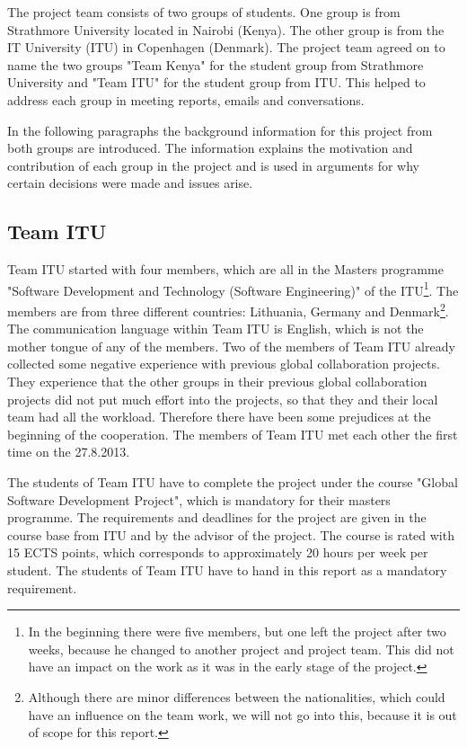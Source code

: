 The project team consists of two groups of students. One group is from Strathmore University located in Nairobi (Kenya). The other group is from the IT University (ITU) in Copenhagen (Denmark). The project team agreed on to name the two groups "Team Kenya" for the student group from Strathmore University and "Team ITU" for the student group from ITU. This helped to address each group in meeting reports, emails and conversations.

In the following paragraphs the background information for this project from both groups are introduced. The information explains the motivation and contribution of each group in the project and is used in arguments for why certain decisions were made and issues arise.


\subsection{Team ITU}
\label{sec:team_ITU}

Team ITU started with four members, which are all in the Masters programme "Software Development and Technology (Software Engineering)" of the ITU\footnote{In the beginning there were five members, but one left the project after two weeks, because he changed to another project and project team. This did not have an impact on the work as it was in the early stage of the project.}. The members are from three different countries: Lithuania, Germany and Denmark\footnote{Although there are minor differences between the nationalities, which could have an influence on the team work, we will not go into this, because it is out of scope for this report.}. The communication language within Team ITU is English, which is not the mother tongue of any of the members. Two of the members of Team ITU already collected some negative experience with previous global collaboration projects. They experience that the other groups in their previous global collaboration projects did not put much effort into the projects, so that they and their local team had all the workload. Therefore there have been some prejudices at the beginning of the cooperation. The members of Team ITU met each other the first time on the 27.8.2013.

The students of Team ITU have to complete the project under the course "Global Software Development Project", which is mandatory for their masters programme. The requirements and deadlines for the project are given in the course base from ITU and by the advisor of the project. The course is rated with 15 ECTS points, which corresponds to approximately 20 hours per week per student. The students of Team ITU have to hand in this report as a mandatory requirement.

